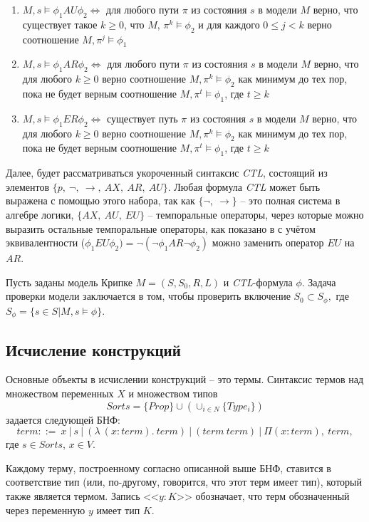 \documentclass[12pt]{article}
\begin{document}
\begin{enumerate}
    \item $M, s \vDash \phi_1 AU \phi_2 \Leftrightarrow$ для любого пути $\pi$ из состояния $s$ в модели $M$ верно, что существует такое $k \geq 0$, что $M$, $\pi^{k} \vDash \phi_2$ и для каждого $0 \leq j < k$ верно соотношение $M, \pi^{j} \vDash \phi_1$

    \item $M, s \vDash \phi_1 AR \phi_2 \Leftrightarrow$ для любого пути $\pi$ из состояния $s$ в модели $M$ верно, что для любого $k \geq 0$ верно соотношение $M, \pi^{k} \vDash \phi_2$ как минимум до тех пор, пока не будет верным соотношение $M, \pi^{t} \vDash \phi_1$, где $t \geq k$

    \item $M, s \vDash \phi_1 ER \phi_2 \Leftrightarrow$ существует путь $\pi$ из состояния $s$ в модели $M$ верно, что для любого $k \geq 0$ верно соотношение $M, \pi^{k} \vDash \phi_2$ как минимум до тех пор, пока не будет верным соотношение $M, \pi^{t} \vDash \phi_1$, где $t \geq k$
    
\end{enumerate}

Далее, будет рассматриваться укороченный синтаксис \textit{CTL}, состоящий из элементов $\{p,\ \neg,\ \xrightarrow{},\ AX,\ AR,\ AU\}$. Любая формула \textit{CTL} может быть выражена с помощью этого набора, так как $\{\neg,\ \xrightarrow{}\}$ -- это полная система в алгебре логики, $\{AX,\ AU,\ EU\}$ -- темпоральные операторы, через которые можно выразить остальные темпоральные операторы, как показано в \cite{Karpov} с учётом эквивалентности  ($\phi_1EU\phi_2)= \neg(\neg\phi_1AR\neg\phi_2)$ можно заменить оператор $EU$ на $AR$.


Пусть заданы модель Крипке $M = (S, S_0, R, L)$ и \textit{CTL}-формула $\phi$. Задача проверки модели заключается в том, чтобы проверить включение $S_0 \subset S_{\phi},$ где $S_{\phi} = \{s \in S | M,s \vDash \phi \}$. 

\subsection{Исчисление конструкций}
Основные объекты в исчислении конструкций -- это термы.
Синтаксис термов над множеством переменных $X$ 
и множеством типов 
$$Sorts=\{Prop\} \cup (\cup_{i \in N} \{Type_i\})$$
задается следующей БНФ:
$$term ::=\ x\ |\ s\ |\ (\lambda\ (x : term).\ term)\ |\ (term\ term)\ |\ \Pi (x:term),\ term,$$ 
где $s \in Sorts$, $x \in V$.

Каждому терму, построенному согласно описанной выше БНФ, 
ставится в соответствие тип (или, по-другому, говорится, что этот терм имеет тип), который также является термом.
Запись <<$y:K$>> обозначает, что терм обозначенный через переменную $y$ имеет тип $K$.
\end{document}
